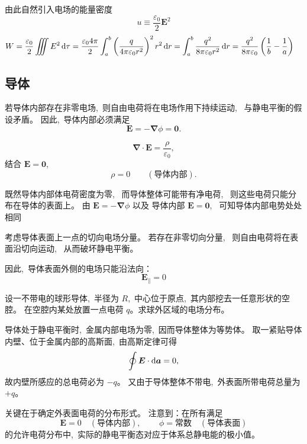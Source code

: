 由此自然引入电场的能量密度
\[
\boxed{
u
\equiv
\frac{\varepsilon_0}{2}\boldsymbol E^2
}
\]
\begin{align*}
    W&=\frac{\varepsilon_0}{2}\iiint E^2\dif\tau
    =\frac{\varepsilon_04\pi}{2}\int_a^b \left(\frac{q}{4\pi\varepsilon_0r^2}\right)^2r^2\dif r
    =\int_a^b \frac{q^2}{8\pi\varepsilon_0r^2}\dif r
    =\frac{q^2}{8\pi\varepsilon_0}\left(\frac{1}{b}-\frac{1}{a}\right)
\end{align*}
\subsection{导体}
若导体内部存在非零电场, \,则自由电荷将在电场作用下持续运动, \,
与静电平衡的假设矛盾。
因此, \,导体内部必须满足
\[
\boldsymbol E = -\boldsymbol{\nabla}\phi = \boldsymbol 0.
\]

\[
\boldsymbol{\nabla}\cdot\boldsymbol E = \frac{\rho}{\varepsilon_0},
\]
结合 $\boldsymbol E=\boldsymbol 0$,
\[
\rho = 0 \qquad (\text{导体内部}).
\]

既然导体内部体电荷密度为零, \,
而导体整体可能带有净电荷, \,
则这些电荷只能分布在导体的表面上。
由 $\boldsymbol E = -\boldsymbol{\nabla}\phi$ 以及
导体内部 $\boldsymbol E=\boldsymbol 0$, \,
可知导体内部电势处处相同

考虑导体表面上一点的切向电场分量。
若存在非零切向分量, \,
则自由电荷将在表面沿切向运动, \,
从而破坏静电平衡。

因此, \,导体表面外侧的电场只能沿法向：
\[
\boldsymbol E_\parallel = 0
\]

设一不带电的球形导体, \,半径为 $R$, \,中心位于原点, \,其内部挖去一任意形状的空腔。
在空腔内某处放置一点电荷 $q$。求球外区域的电场分布。

导体处于静电平衡时, \,金属内部电场为零, \,因而导体整体为等势体。
取一紧贴导体内壁、位于金属内部的高斯面, \,由高斯定律可得
\[
\oint \boldsymbol E\cdot \dif \boldsymbol a = 0,
\]
故内壁所感应的总电荷必为 $-q$。
又由于导体整体不带电, \,外表面所带电荷总量为 $+q$。

\medskip

关键在于确定外表面电荷的分布形式。
注意到：在所有满足
\[
\boldsymbol E = 0 \quad (\text{导体内部}), \,\qquad 
\phi = \text{常数} \quad (\text{导体表面})
\]
的允许电荷分布中, \,实际的静电平衡态对应于体系总静电能的极小值。

